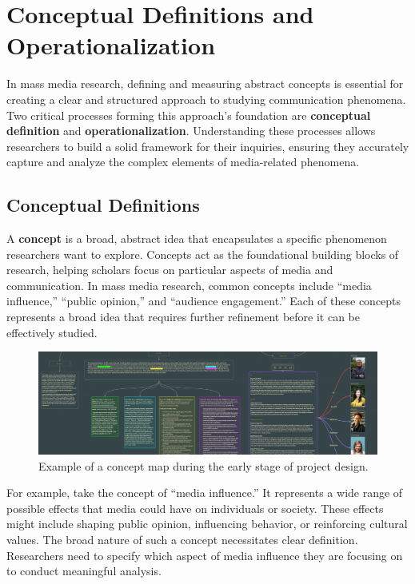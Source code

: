 \documentclass[
]{book}
\begin{document}
\section{Conceptual Definitions and Operationalization}\label{conceptual-definitions-and-operationalization}

In mass media research, defining and measuring abstract concepts is essential for creating a clear and structured approach to studying communication phenomena. Two critical processes forming this approach's foundation are \textbf{conceptual definition} and \textbf{operationalization}. Understanding these processes allows researchers to build a solid framework for their inquiries, ensuring they accurately capture and analyze the complex elements of media-related phenomena.

\subsection*{Conceptual Definitions}\label{conceptual-definitions}

A \textbf{concept} is a broad, abstract idea that encapsulates a specific phenomenon researchers want to explore. Concepts act as the foundational building blocks of research, helping scholars focus on particular aspects of media and communication. In mass media research, common concepts include ``media influence,'' ``public opinion,'' and ``audience engagement.'' Each of these concepts represents a broad idea that requires further refinement before it can be effectively studied.

\begin{figure}
\centering
\includegraphics[width=1\textwidth,height=\textheight]{images/concept-map.png}
\caption{Example of a concept map during the early stage of project design.}
\end{figure}

For example, take the concept of ``media influence.'' It represents a wide range of possible effects that media could have on individuals or society. These effects might include shaping public opinion, influencing behavior, or reinforcing cultural values. The broad nature of such a concept necessitates clear definition. Researchers need to specify which aspect of media influence they are focusing on to conduct meaningful analysis.
\end{document}

